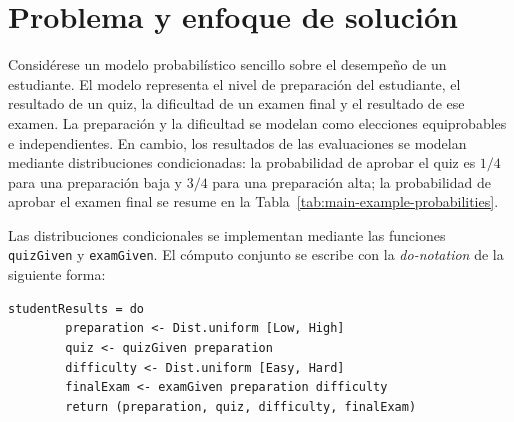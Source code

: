 
\section{Problema y enfoque de solución}
\label{sec:problema-enfoque-solucion}

Considérese un modelo probabilístico sencillo sobre el desempeño de un estudiante. El modelo representa el nivel de preparación del estudiante, el resultado de un quiz, la dificultad de un examen final y el resultado de ese examen. La preparación y la dificultad se modelan como elecciones equiprobables e independientes. En cambio, los resultados de las evaluaciones se modelan mediante distribuciones condicionadas: la probabilidad de aprobar el quiz es $1/4$ para una preparación baja y $3/4$ para una preparación alta; la probabilidad de aprobar el examen final se resume en la Tabla~\ref{tab:main-example-probabilities}.

\begin{table}[ht]
\centering
\TableSetup
{}
\caption{Probabilidad de aprobar el examen final según preparación y dificultad.}
\label{tab:main-example-probabilities}
\end{table}

Las distribuciones condicionales se implementan mediante las funciones \texttt{quizGiven} y \texttt{examGiven}. El cómputo conjunto se escribe con la \textit{do-notation} de la siguiente forma:

\begin{lstlisting}[style=haskell,caption={Modelo probabilístico del desempeño de un estudiante.},label={lst:main-example}]
    studentResults = do
        preparation <- Dist.uniform [Low, High]
        quiz <- quizGiven preparation
        difficulty <- Dist.uniform [Easy, Hard]
        finalExam <- examGiven preparation difficulty
        return (preparation, quiz, difficulty, finalExam)
\end{lstlisting}

